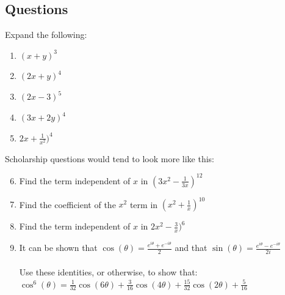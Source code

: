 \documentclass[../main.tex]{subfiles}
\begin{document}
\pagebreak

\subsection*{Questions}
\label{Binomial Expansion}
Expand the following:

\begin{enumerate}
    \item \( (x+y)^3 \)
    \item \( (2x+y)^4 \)
    \item \( (2x-3)^5 \)
    \item \( (3x+2y)^4 \)
    \item \( 2x + \frac{1}{x^2 } )^4 \)
\end{enumerate}

Scholarship questions would tend to look more like this:

\begin{enumerate}
    \setcounter{enumi}{5}
    \item Find the term independent of \( x \) in \( (3x^2 - \frac{1}{3x})^{12}  \)
    \item Find the coefficient of the \( x^2 \) term in \( (x^2 + \frac{1}{x})^{10} \)
    \item Find the term independent of \( x \) in \( 2x^2 - \frac{3}{x})^6 \)
    \item It can be shown that \( \cos(\theta) = \frac{e^{i\theta}+e^{-i\theta}}{2}\) and that \( \sin(\theta) = \frac{e^{i\theta}-e^{-i\theta}}{2i}\)\\ \\
    Use these identities, or otherwise, to show that:\\
    \( \cos^6(\theta) = \frac{1}{32}\cos(6\theta) + \frac{3}{16}\cos(4\theta)+\frac{15}{32}\cos(2\theta)+\frac{5}{16}\)
\end{enumerate}
\end{document}
